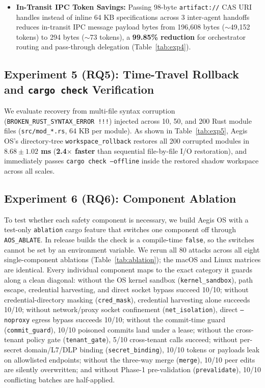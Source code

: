 \documentclass[10pt,twocolumn]{article}
\begin{document}
\begin{itemize}
    \item \textbf{In-Transit IPC Token Savings:} Passing 98-byte \texttt{artifact://} CAS URI handles instead of inline 64 KB specifications across 3 inter-agent handoffs reduces in-transit IPC message payload bytes from 196,608 bytes ($\sim$49,152 tokens) to 294 bytes ($\sim$73 tokens), a \textbf{99.85\% reduction} for orchestrator routing and pass-through delegation (Table~\ref{tab:exp4}).
\end{itemize}

\subsection{Experiment 5 (RQ5): Time-Travel Rollback and \texttt{cargo check} Verification}

We evaluate recovery from multi-file syntax corruption (\texttt{BROKEN\_RUST\_SYNTAX\_ERROR !!!}) injected across 10, 50, and 200 Rust module files (\texttt{src/mod\_*.rs}, 64 KB per module). As shown in Table~\ref{tab:exp5}, Aegis OS's directory-tree \texttt{workspace\_rollback} restores all 200 corrupted modules in \textbf{$8.68 \pm 1.02$ ms} (\textbf{2.4$\times$ faster} than sequential file-by-file I/O restoration), and immediately passes \texttt{cargo check --offline} inside the restored shadow workspace across all scales.

\subsection{Experiment 6 (RQ6): Component Ablation}

To test whether each safety component is necessary, we build Aegis OS with a test-only \texttt{ablation} cargo feature that switches one component off through \texttt{AOS\_ABLATE}. In release builds the check is a compile-time \texttt{false}, so the switches cannot be set by an environment variable. We rerun all 80 attacks across all eight single-component ablations (Table~\ref{tab:ablation}); the macOS and Linux matrices are identical. Every individual component maps to the exact category it guards along a clean diagonal: without the OS kernel sandbox (\texttt{kernel\_sandbox}), path escape, credential harvesting, and direct socket bypass succeed 10/10; without credential-directory masking (\texttt{cred\_mask}), credential harvesting alone succeeds 10/10; without network/proxy socket confinement (\texttt{net\_isolation}), direct \texttt{--noproxy} egress bypass succeeds 10/10; without the commit-time guard (\texttt{commit\_guard}), 10/10 poisoned commits land under a lease; without the cross-tenant policy gate (\texttt{tenant\_gate}), 5/10 cross-tenant calls succeed; without per-secret domain/L7/DLP binding (\texttt{secret\_binding}), 10/10 tokens or payloads leak on allowlisted endpoints; without the three-way merge (\texttt{merge}), 10/10 peer edits are silently overwritten; and without Phase-1 pre-validation (\texttt{prevalidate}), 10/10 conflicting batches are half-applied.
\end{document}
